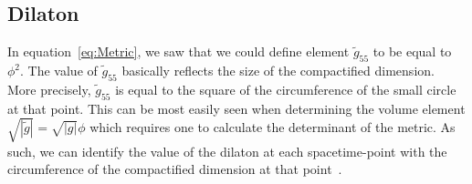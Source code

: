 \documentclass[a4paper,12pt]{article}
\numberwithin{equation}{section}
\begin{document}
\subsection{Dilaton}
\label{sec:Dilaton}

In equation~\ref{eq:Metric}, we saw that we could define element $\tilde{g}_{55}$ to be equal to $\phi^2$. The value of $\tilde{g}_{55}$ basically reflects the size of the compactified dimension. More precisely, $\tilde{g}_{55}$ is equal to the square of the circumference of the small circle at that point. This can be most easily seen when determining the volume element $\sqrt{|\tilde{g}|}=\sqrt{|g|}\phi$ which requires one to calculate the determinant of the metric. As such, we can identify the value of the dilaton at each spacetime-point with the circumference of the compactified dimension at that point~\cite{Zee2013}.
\end{document}
